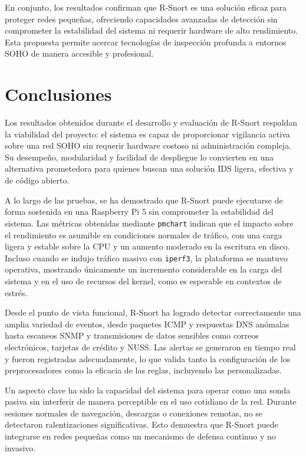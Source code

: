 \documentclass[11pt,a4paper,twoside]{report}
\begin{document}
En conjunto, los resultados confirman que R-Snort es una solución eficaz para proteger redes pequeñas, ofreciendo capacidades avanzadas de detección sin comprometer la estabilidad del sistema ni requerir hardware de alto rendimiento. Esta propuesta permite acercar tecnologías de inspección profunda a entornos SOHO de manera accesible y profesional.


\chapter*{Conclusiones}

Los resultados obtenidos durante el desarrollo y evaluación de R-Snort respaldan la viabilidad del proyecto: el sistema es capaz de proporcionar vigilancia activa sobre una red SOHO sin requerir hardware costoso ni administración compleja. Su desempeño, modularidad y facilidad de despliegue lo convierten en una alternativa prometedora para quienes buscan una solución IDS ligera, efectiva y de código abierto.\newline

A lo largo de las pruebas, se ha demostrado que R-Snort puede ejecutarse de forma sostenida en una Raspberry Pi 5 sin comprometer la estabilidad del sistema. Las métricas obtenidas mediante \texttt{pmchart} indican que el impacto sobre el rendimiento es asumible en condiciones normales de tráfico, con una carga ligera y estable sobre la CPU y un aumento moderado en la escritura en disco. Incluso cuando se indujo tráfico masivo con \texttt{iperf3}, la plataforma se mantuvo operativa, mostrando únicamente un incremento considerable en la carga del sistema y en el uso de recursos del kernel, como es esperable en contextos de estrés.\newline

Desde el punto de vista funcional, R-Snort ha logrado detectar correctamente una amplia variedad de eventos, desde paquetes ICMP y respuestas DNS anómalas hasta escaneos SNMP y transmisiones de datos sensibles como correos electrónicos, tarjetas de crédito y NUSS. Las alertas se generaron en tiempo real y fueron registradas adecuadamente, lo que valida tanto la configuración de los preprocesadores como la eficacia de las reglas, incluyendo las personalizadas.\newline

Un aspecto clave ha sido la capacidad del sistema para operar como una sonda pasiva sin interferir de manera perceptible en el uso cotidiano de la red. Durante sesiones normales de navegación, descargas o conexiones remotas, no se detectaron ralentizaciones significativas. Esto demuestra que R-Snort puede integrarse en redes pequeñas como un mecanismo de defensa continuo y no invasivo.\newline
\end{document}
